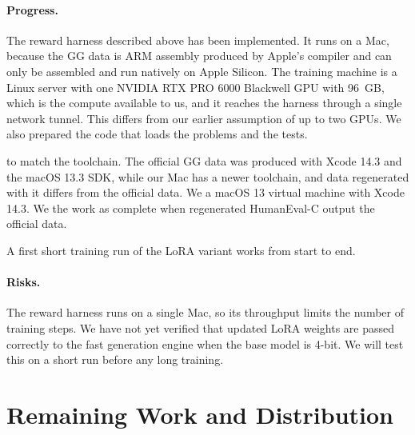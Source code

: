 \documentclass{article}
\newif\iftracked
\newcommand{\added}[1]{\iftracked\hl{#1}\else#1\fi}
\newcommand{\deleted}[1]{\iftracked\textcolor{red}{\st{#1}}\ \fi}
\begin{document}
\paragraph{Progress.}
The reward harness described above has been implemented. It runs on a Mac, because the GG data is ARM assembly produced by Apple's compiler and can only be assembled and run natively on Apple Silicon. The training machine is a Linux server with one NVIDIA RTX \added{PRO} 6000 Blackwell GPU\added{ with 96~GB}, which is the compute available to us, and it reaches the harness through a single network tunnel. This differs from our earlier assumption of up to two GPUs. We also prepared the code that loads the problems and the tests.

\deleted{The remaining step before training is} to match the toolchain. The official GG data was produced with Xcode 14.3 and the macOS 13.3 SDK, while our Mac has a newer toolchain, and data regenerated with it differs from the official data. We \deleted{are therefore building} a macOS 13 virtual machine with Xcode 14.3\deleted{ and will regenerate our data and run the harness inside it}. We \deleted{treat} the work as complete when regenerated HumanEval-C output \deleted{matches} the official data. \deleted{This step is in progress.}

\added{A first short training run of the LoRA variant works from start to end.}

\paragraph{Risks.}
The reward harness runs on a single Mac, so its throughput limits the number of training steps. We have not yet verified that updated LoRA weights are passed correctly to the fast generation engine when the base model is 4-bit. We will test this on a short run before any long training. \deleted{Some test problems overlap between datasets, and we remove duplicates before training.}

\section{Remaining Work and Distribution}
\label{sec:remaining}
\end{document}
